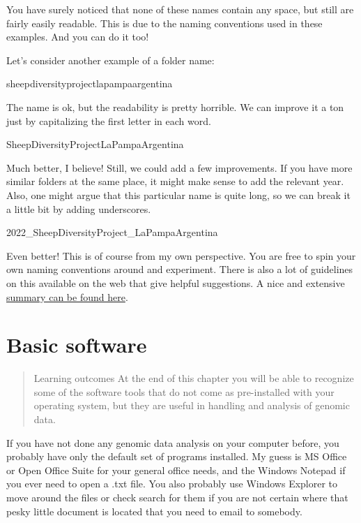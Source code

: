 \documentclass[]{book}
\begin{document}
You have surely noticed that none of these names contain any space, but
still are fairly easily readable. This is due to the naming conventions
used in these examples. And you can do it too!

Let's consider another example of a folder name:

sheepdiversityprojectlapampaargentina

The name is ok, but the readability is pretty horrible. We can improve
it a ton just by capitalizing the first letter in each word.

SheepDiversityProjectLaPampaArgentina

Much better, I believe! Still, we could add a few improvements. If you
have more similar folders at the same place, it might make sense to add
the relevant year. Also, one might argue that this particular name is
quite long, so we can break it a little bit by adding underscores.

2022\_SheepDiversityProject\_LaPampaArgentina

Even better! This is of course from my own perspective. You are free to
spin your own naming conventions around and experiment. There is also a
lot of guidelines on this available on the web that give helpful
suggestions. A nice and extensive
\href{https://www.huridocs.org/2016/07/file-naming-conventions-why-you-want-them-and-how-to-create-them/}{summary
can be found here}.

\hypertarget{basic-software}{\chapter{Basic
software}\label{basic-software}}

\begin{quote}
Learning outcomes At the end of this chapter you will be able to
recognize some of the software tools that do not come as pre-installed
with your operating system, but they are useful in handling and analysis
of genomic data.
\end{quote}

If you have not done any genomic data analysis on your computer before,
you probably have only the default set of programs installed. My guess
is MS Office or Open Office Suite for your general office needs, and the
Windows Notepad if you ever need to open a .txt file. You also probably
use Windows Explorer to move around the files or check search for them
if you are not certain where that pesky little document is located that
you need to email to somebody.
\end{document}
